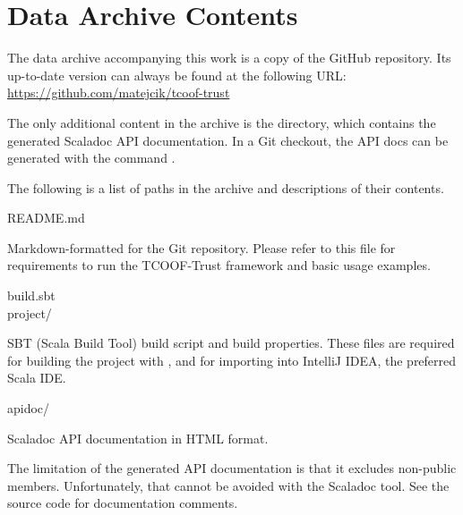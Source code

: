 \chapter{Data Archive Contents}

The data archive accompanying this work is a copy of the  GitHub
repository. Its up-to-date version can always be found at the following URL:
\href{https://github.com/matejcik/tcoof-trust}{\ttfamily https://github.com/matejcik/tcoof-trust}

The only additional content in the archive is the  directory, which contains
the generated Scaladoc API documentation. In a Git checkout, the API docs can be
generated with the command .

The following is a list of paths in the archive and descriptions of their contents.

\bigskip

\newenvironment{filepath}%
    {%
        \par\vspace{0.6em}\ttfamily\raggedright
    }%
    {%
        \vspace{-0.2em}
    }%

\begin{filepath}
README.md
\end{filepath}
\begin{dsldesc}
    Markdown-formatted  for the Git repository. Please refer to this file for
    requirements to run the TCOOF-Trust framework and basic usage examples.
\end{dsldesc}

\begin{filepath}
build.sbt\\
project/
\end{filepath}
\begin{dsldesc}
    SBT (Scala Build Tool) build script and build properties. These files are required
    for building the project with , and for importing into IntelliJ IDEA, the
    preferred Scala IDE.
\end{dsldesc}

\begin{filepath}
apidoc/
\end{filepath}
\begin{dsldesc}
    Scaladoc API documentation in HTML format.

    The limitation of the generated API documentation is that it excludes non-public
    members. Unfortunately, that cannot be avoided with the Scaladoc tool. See the
    source code for documentation comments.
\end{dsldesc}

